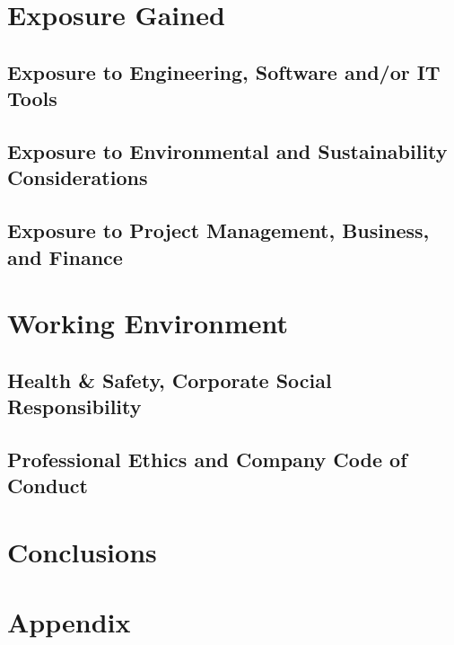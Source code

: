 \documentclass[12pt]{article}
\begin{document}
\clearpage

\section{Exposure Gained}
\subsection{Exposure to Engineering, Software and/or IT Tools}
\subsection{Exposure to Environmental and Sustainability Considerations}
\subsection{Exposure to Project Management, Business, and Finance}

\clearpage

\section{Working Environment}
\subsection{Health \& Safety, Corporate Social Responsibility}
\subsection{Professional Ethics and Company Code of Conduct}

\clearpage

\section{Conclusions}

\clearpage

\printbibliography
{}

\clearpage

\section*{Appendix}
\end{document}
